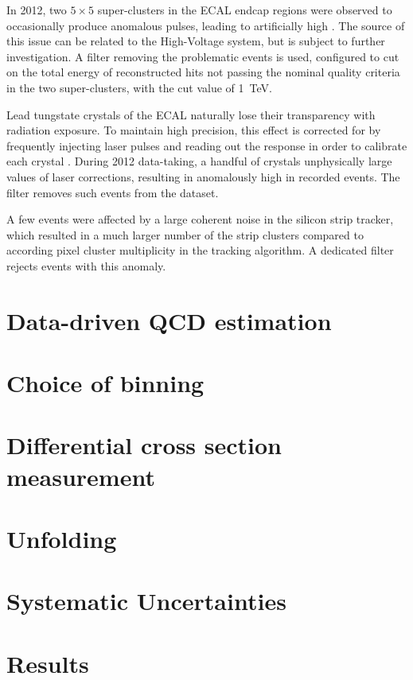 \begin{description}[wide=\parindent]
	\item[Bad ECAL endcap super-cluster filter.] In 2012, two $5\times5$ super-clusters in the ECAL endcap regions were
	observed to occasionally produce anomalous pulses, leading to artificially high \MET. The source of this issue can
	be related to the High-Voltage system, but is subject to further investigation. A filter removing the problematic
	events is used, configured to cut on the total energy of reconstructed hits not passing the nominal quality criteria
	in the two super-clusters, with the cut value of \SI{1}{\TeV}.

	\item[ECAL laser correction filter.] Lead tungstate crystals of the ECAL naturally lose their transparency with
	radiation exposure. To maintain high precision, this effect is corrected for by frequently injecting laser pulses
	and reading out the response in order to calibrate each crystal \autocite{CMS_TDR1}. During 2012 data-taking, a
	handful of crystals unphysically large values of laser corrections, resulting in anomalously high \MET in recorded
	events. The filter removes such events from the dataset.

	\item[Strip tracker noise filter.] A few events were affected by a large coherent noise in the silicon strip
	tracker, which resulted in a much larger number of the strip clusters compared to according pixel cluster
	multiplicity in the tracking algorithm. A dedicated filter rejects events with this anomaly.

\end{description}

\section{Data-driven QCD estimation}
\label{s_xsection:data_driven_QCD}

\section{Choice of binning}
\label{s_xsection:binning}

\section{Differential cross section measurement}
\label{s_xsection:measurement}

\section{Unfolding}
\label{s_xsection:unfolding}

\section{Systematic Uncertainties}
\label{s_xsection:systematics}

\section{Results}
\label{s_xsection:results}

